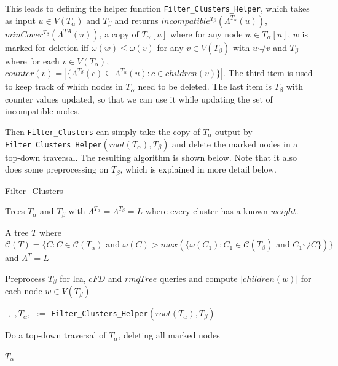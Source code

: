 \documentclass{article}
\newcommand{\compatible}{\smile}
\newcommand{\leafset}{\Lambda}
\newcommand{\weight}{\omega}
\newcommand{\TA}{T_\alpha}
\newcommand{\TB}{T_\beta}
\begin{document}
    This leads to defining the helper function \texttt{Filter\_Clusters\_Helper}, which takes as input $u \in V(\TA)$ and $\TB$ and returns $incompatible^{\TB}(\leafset^{\TA}(u))$, $minCover^{\TB}(\leafset^{TA}(u))$, a copy of $\TA[u]$ where for any node $w \in \TA[u]$, $w$ is marked for deletion iff $\weight(w) \leq \weight(v)$ for any $v \in V(\TB)$ with $u \not\compatible v$ and $\TB$ where for each $v \in V(\TA)$, $counter(v) = |\{\leafset^{\TB}(c) \subseteq \leafset^{\TA}(u) : c \in children(v)\}|$. The third item is used to keep track of which nodes in $\TA$ need to be deleted. The last item is $\TB$ with counter values updated, so that we can use it while updating the set of incompatible nodes.

    Then \texttt{Filter\_Clusters} can simply take the copy of $\TA$ output by \texttt{Filter\_Clusters\_Helper}$(root(\TA), \TB)$ and delete the marked nodes in a top-down traversal. The resulting algorithm is shown below. Note that it also does some preprocessing on $\TB$, which is explained in more detail below.

    \begin{algorithm}
        \caption{Filter\_Clusters}
        \label{alg:filterclusters}

        \begin{algorithmic}[1]
            \Input Trees $\TA$ and $\TB$ with $\leafset^{\TA} = \leafset^{\TB} = L$ where every cluster has a known $weight$.

            \Output A tree $T$ where $\mathcal{C}(T) = \{C : C \in \mathcal{C}(\TA) \text{ and } \weight(C) > max(\{\weight(C_1) : C_1 \in \mathcal{C}(\TB) \text{ and } C_1 \not\compatible C\})\}$ and $\leafset^T = L$

            \State Preprocess $\TB$ for lca, $cFD$ and $rmqTree$ queries and compute $|children(w)|$ for each node $w \in V(\TB)$

            \State $\_, \_, \TA, \_ :=$ \texttt{Filter\_Clusters\_Helper}$(root(\TA), \TB)$

            \State Do a top-down traversal of $\TA$, deleting all marked nodes

            \State \Return $\TA$
        \end{algorithmic}
    \end{algorithm}
\end{document}
